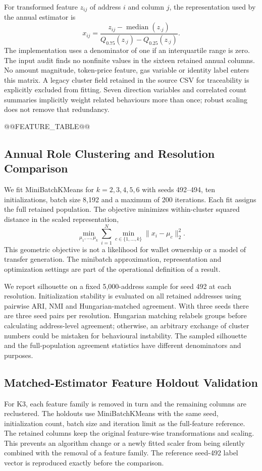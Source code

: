 For transformed feature $z_{ij}$ of address $i$ and column $j$, the representation used by the annual estimator is
\begin{equation}
 x_{ij}=\frac{z_{ij}-\operatorname{median}(z_{\cdot j})}{Q_{0.75}(z_{\cdot j})-Q_{0.25}(z_{\cdot j})}.
\end{equation}
The implementation uses a denominator of one if an interquartile range is zero. The input audit finds no nonfinite values in the sixteen retained annual columns. No amount magnitude, token-price feature, gas variable or identity label enters this matrix. A legacy cluster field retained in the source CSV for traceability is explicitly excluded from fitting. Seven direction variables and correlated count summaries implicitly weight related behaviours more than once; robust scaling does not remove that redundancy.

@@FEATURE_TABLE@@

\subsection{Annual Role Clustering and Resolution Comparison}
We fit MiniBatchKMeans for $k=2,3,4,5,6$ with seeds 492--494, ten initializations, batch size 8,192 and a maximum of 200 iterations. Each fit assigns the full retained population. The objective minimizes within-cluster squared distance in the scaled representation,
\begin{equation}
 \min_{\mu_1,\ldots,\mu_k}\sum_{i=1}^{N}\min_{c\in\{1,\ldots,k\}}\|x_i-\mu_c\|_2^2.
\end{equation}
This geometric objective is not a likelihood for wallet ownership or a model of transfer generation. The minibatch approximation, representation and optimization settings are part of the operational definition of a result.

We report silhouette on a fixed 5,000-address sample for seed 492 at each resolution. Initialization stability is evaluated on all retained addresses using pairwise ARI, NMI and Hungarian-matched agreement. With three seeds there are three seed pairs per resolution. Hungarian matching relabels groups before calculating address-level agreement; otherwise, an arbitrary exchange of cluster numbers could be mistaken for behavioural instability. The sampled silhouette and the full-population agreement statistics have different denominators and purposes.

\subsection{Matched-Estimator Feature Holdout Validation}
For K3, each feature family is removed in turn and the remaining columns are reclustered. The holdouts use MiniBatchKMeans with the same seed, initialization count, batch size and iteration limit as the full-feature reference. The retained columns keep the original feature-wise transformations and scaling. This prevents an algorithm change or a newly fitted scaler from being silently combined with the removal of a feature family. The reference seed-492 label vector is reproduced exactly before the comparison.

